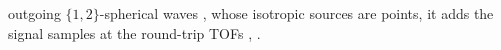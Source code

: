 outgoing $\{ 1, 2 \}$-spherical waves
\cite{article:ProvostPMB2014,article:PapadacciITUFFC2014,article:JensenUlt2006}, whose
isotropic sources are
points,
it adds
the signal samples at
the round-trip \acp{TOF}
\cite[(2), (6)]{article:MontaldoITUFFC2009},
\cite[(4), (5)]{article:JensenUlt2006}.
